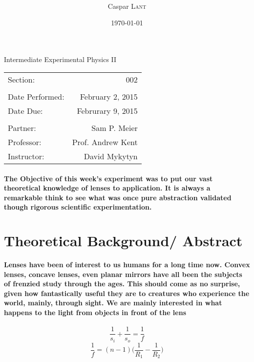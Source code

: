 \documentclass{amsart}
\title{      }
\author{Caspar \textsc{Lant}} %
\date{\today} %
\begin{document}
\bigskip

\maketitle %
\begin{center}

Intermediate Experimental Physics II\\
\vspace{1.5cm}

\begin{tabular}{l r}

Section: & 002\\
\\
Date Performed: & February 2, 2015 \\ %
Date Due: & Februrary 9, 2015\\
\\
Partner: & Sam P. Meier \\ %
Professor: & Prof. Andrew Kent\\ 
Instructor: & David Mykytyn %
\end{tabular}
\end{center}
\vspace{50mm}
\pagebreak

\paragraph{\textbf{The Objective} of this week's experiment was to put our vast theoretical knowledge of lenses to application. It is always a remarkable think to see what was once pure abstraction validated though rigorous scientific experimentation. }

\section{Theoretical Background/ Abstract}
\paragraph{Lenses have been of interest to us humans for a long time now. Convex lenses, concave lenses, even planar mirrors have all been the subjects of frenzied study through the ages. This should come as no surprise, given how fantastically useful they are to creatures who experience the world, mainly, through sight. We are mainly interested in what happens to the light from objects in front of the lens}
\begin{equation}
\frac{1}{s_i}+ \frac{1}{s_o} = \frac{1}{f}
\end{equation}
\begin{equation}
\frac{1}{f} = (n-1)\Big(\frac{1}{R_1} - \frac{1}{R_2}\Big)
\end{equation}
\end{document}
